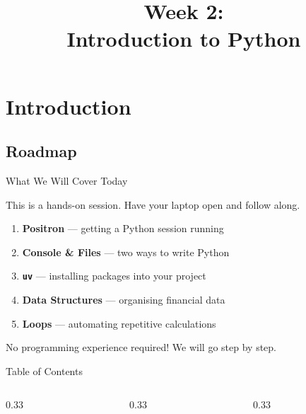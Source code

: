\documentclass[9pt,aspectratio=169]{beamer}
\title{\LARGE \textnormal{Week 2: \\
Introduction to Python}}
\begin{document}
\begin{frame}[plain]
\titlepage
\end{frame}


\section{Introduction}
\subsection{Roadmap}

\begin{frame}{What We Will Cover Today}

This is a \alert{hands-on session}. Have your laptop open and follow along.

\medskip

\begin{enumerate}
    \item \textbf{Positron} --- getting a Python session running
    \item \textbf{Console \& Files} --- two ways to write Python
    \item \textbf{\texttt{uv}} --- installing packages into your project
    \item \textbf{Data Structures} --- organising financial data
    \item \textbf{Loops} --- automating repetitive calculations
\end{enumerate}

\medskip

\begin{highlightbox}
\centering
No programming experience required! We will go step by step.
\end{highlightbox}

\end{frame}


\begin{frame}{Table of Contents}
\begin{columns}[t]
  \begin{column}{0.33\textwidth}
    \tableofcontents[sections={1-3}]
  \end{column}
  \begin{column}{0.33\textwidth}
    \tableofcontents[sections={4-6}]
  \end{column}
  \begin{column}{0.33\textwidth}
    \tableofcontents[sections={7-8}]
  \end{column}
\end{columns}
\end{frame}
\end{document}
